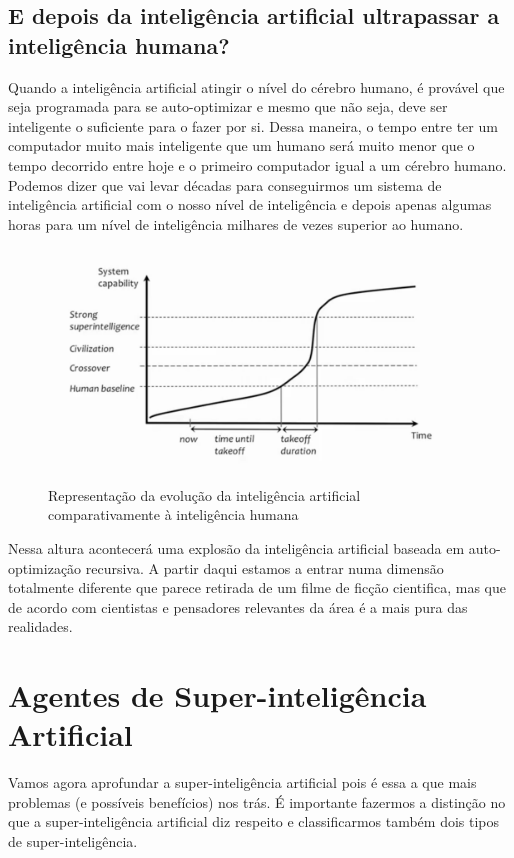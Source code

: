 \documentclass[runningheads,a4paper]{llncs}
\begin{document}
\subsection*{E depois da inteligência artificial ultrapassar a inteligência humana?}

Quando a inteligência artificial atingir o nível do cérebro humano, é provável que seja programada para se auto-optimizar e mesmo que não seja, deve ser inteligente o suficiente para o fazer por si. Dessa maneira, o tempo entre ter um computador muito mais inteligente que um humano será muito menor que o tempo decorrido entre hoje e o primeiro computador igual a um cérebro humano. Podemos dizer que vai levar décadas para conseguirmos um sistema de inteligência artificial com o nosso nível de inteligência e depois apenas algumas horas para um nível de inteligência milhares de vezes superior ao humano.

\begin{figure}[ht!]
  \centering
  \includegraphics[width=110mm]{plot2.png}
  \caption{Representação da evolução da inteligência artificial comparativamente à inteligência humana\label{overflow}}
\end{figure}

Nessa altura acontecerá uma explosão da inteligência artificial baseada em auto-optimização recursiva. A partir daqui estamos a entrar numa dimensão totalmente diferente que parece retirada de um filme de ficção cientifica, mas que de acordo com cientistas e pensadores relevantes da área é a mais pura das realidades.


\section{Agentes de Super-inteligência Artificial}

Vamos agora aprofundar a super-inteligência artificial pois é essa a que mais problemas (e possíveis benefícios) nos trás. É importante fazermos a distinção no que a super-inteligência artificial diz respeito e classificarmos também dois tipos de super-inteligência.
\end{document}
